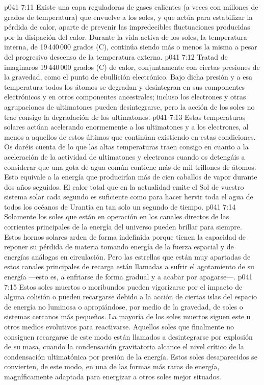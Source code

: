 \vs p041 7:11 \pc Existe una capa reguladoras de gases calientes (a veces con millones de grados de temperatura) que envuelve a los soles, y que actúa para estabilizar la pérdida de calor, aparte de prevenir las impredecibles fluctuaciones producidas por la disipación del calor. Durante la vida activa de los soles, la temperatura interna, de 19\,440\,000 grados (C), continúa siendo más o menos la misma a pesar del progresivo descenso de la temperatura externa.
\vs p041 7:12 \pc Tratad de imaginaros 19\,440\,000 grados (C) de calor, conjuntamente con ciertas presiones de la gravedad, como el punto de ebullición electrónico. Bajo dicha presión y a esa temperatura todos los átomos se degradan y desintegran en sus componentes electrónicos y en otros componentes ancestrales; incluso los electrones y otras agrupaciones de ultimatones pueden desintegrarse, pero la acción de los soles no trae consigo la degradación de los ultimatones.
\vs p041 7:13 Estas temperaturas solares actúan acelerando enormemente a los ultimatones y a los electrones, al menos a aquellos de estos últimos que continúan existiendo en estas condiciones. Os daréis cuenta de lo que las altas temperaturas traen consigo en cuanto a la aceleración de la actividad de ultimatones y electrones cuando os detengáis a considerar que una gota de agua común contiene más de mil trillones de átomos. Esto equivale a la energía que producirían más de cien caballos de vapor durante dos años seguidos. El calor total que en la actualidad emite el Sol de vuestro sistema solar cada segundo es suficiente como para hacer hervir toda el agua de todos los océanos de Urantia en tan solo un segundo de tiempo.
\vs p041 7:14 \pc Solamente los soles que están en operación en los canales directos de las corrientes principales de la energía del universo pueden brillar para siempre. Estos hornos solares arden de forma indefinida porque tienen la capacidad de reponer su pérdida de materia tomando energía de la fuerza espacial y de energías análogas en circulación. Pero las estrellas que están muy apartadas de estos canales principales de recarga están llamadas a sufrir el agotamiento de su energía ---esto es, a enfriarse de forma gradual y a acabar por apagarse---.
\vs p041 7:15 Estos soles muertos o moribundos pueden vigorizarse por el impacto de alguna colisión o pueden recargarse debido a la acción de ciertas islas del espacio de energía no luminosa o apropiándose, por medio de la gravedad, de soles o sistemas cercanos más pequeños. La mayoría de los soles muertos siguen este u otros medios evolutivos para reactivarse. Aquellos soles que finalmente no consiguen recargarse de este modo están llamados a desintegrarse por explosión de su masa, cuando la condensación gravitatoria alcance el nivel crítico de la condensación ultimatónica por presión de la energía. Estos soles desaparecidos se convierten, de este modo, en una de las formas más raras de energía, magníficamente adaptada para energizar a otros soles mejor situados.

